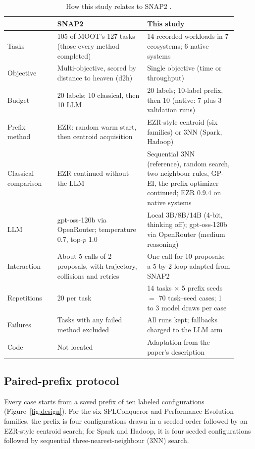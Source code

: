 \begin{table}[t]
\centering
\caption{How this study relates to SNAP2 \cite{srinivasan2026snap2}.}
\label{tab:snap2}
\small
\begin{tabular}{p{0.2\linewidth}p{0.36\linewidth}p{0.36\linewidth}}
\toprule
 & SNAP2 & This study \\
\midrule
Tasks & 105 of MOOT's 127 tasks (those every method completed) & 14 recorded workloads in 7 ecosystems; 6 native systems \\
Objective & Multi-objective, scored by distance to heaven (d2h) & Single objective (time or throughput) \\
Budget & 20 labels; 10 classical, then 10 LLM & 20 labels; 10-label prefix, then 10 (native: 7 plus 3 validation runs) \\
Prefix method & EZR: random warm start, then centroid acquisition & EZR-style centroid (six families) or 3NN (Spark, Hadoop) \\
Classical comparison & EZR continued without the LLM & Sequential 3NN (reference), random search, two neighbour rules, GP-EI, the prefix optimizer continued; EZR 0.9.4 on native systems \\
LLM & gpt-oss-120b via OpenRouter; temperature 0.7, top-$p$ 1.0 & Local 3B/8B/14B (4-bit, thinking off); gpt-oss-120b via OpenRouter (medium reasoning) \\
Interaction & About 5 calls of 2 proposals, with trajectory, collisions and retries & One call for 10 proposals; a 5-by-2 loop adapted from SNAP2 \\
Repetitions & 20 per task & 14 tasks $\times$ 5 prefix seeds $=$ 70 task--seed cases; 1 to 3 model draws per case \\
Failures & Tasks with any failed method excluded & All runs kept; fallbacks charged to the LLM arm \\
Code & Not located & Adaptation from the paper's description \\
\bottomrule
\end{tabular}
\end{table}

\subsection{Paired-prefix protocol}

Every case starts from a saved prefix of ten labeled configurations (Figure~\ref{fig:design}). For the six SPLConqueror and Performance Evolution families, the prefix is four configurations drawn in a seeded order followed by an EZR-style centroid search; for Spark and Hadoop, it is four seeded configurations followed by sequential three-nearest-neighbour (3NN) search.

